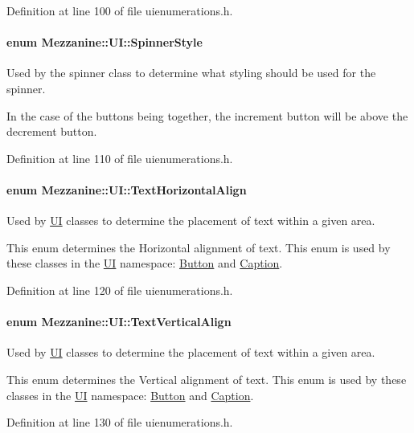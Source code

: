 Definition at line 100 of file uienumerations.h.

\hypertarget{namespaceMezzanine_1_1UI_a62462d4df783dcdda77e1590a96bc6d6}{
\paragraph[{SpinnerStyle}]{\setlength{\rightskip}{0pt plus 5cm}enum {\bf Mezzanine::UI::SpinnerStyle}}\hfill}
\label{namespaceMezzanine_1_1UI_a62462d4df783dcdda77e1590a96bc6d6}


Used by the spinner class to determine what styling should be used for the spinner. 

In the case of the buttons being together, the increment button will be above the decrement button. 

Definition at line 110 of file uienumerations.h.

\hypertarget{namespaceMezzanine_1_1UI_aebbd46e62bb20d958f1915c1ec6cc549}{
\paragraph[{TextHorizontalAlign}]{\setlength{\rightskip}{0pt plus 5cm}enum {\bf Mezzanine::UI::TextHorizontalAlign}}\hfill}
\label{namespaceMezzanine_1_1UI_aebbd46e62bb20d958f1915c1ec6cc549}


Used by \hyperlink{namespaceMezzanine_1_1UI}{UI} classes to determine the placement of text within a given area. 

This enum determines the Horizontal alignment of text. This enum is used by these classes in the \hyperlink{namespaceMezzanine_1_1UI}{UI} namespace: \hyperlink{classMezzanine_1_1UI_1_1Button}{Button} and \hyperlink{classMezzanine_1_1UI_1_1Caption}{Caption}. 

Definition at line 120 of file uienumerations.h.

\hypertarget{namespaceMezzanine_1_1UI_ab35e3845e2541698245262cc17147ae9}{
\paragraph[{TextVerticalAlign}]{\setlength{\rightskip}{0pt plus 5cm}enum {\bf Mezzanine::UI::TextVerticalAlign}}\hfill}
\label{namespaceMezzanine_1_1UI_ab35e3845e2541698245262cc17147ae9}


Used by \hyperlink{namespaceMezzanine_1_1UI}{UI} classes to determine the placement of text within a given area. 

This enum determines the Vertical alignment of text. This enum is used by these classes in the \hyperlink{namespaceMezzanine_1_1UI}{UI} namespace: \hyperlink{classMezzanine_1_1UI_1_1Button}{Button} and \hyperlink{classMezzanine_1_1UI_1_1Caption}{Caption}. 

Definition at line 130 of file uienumerations.h.

